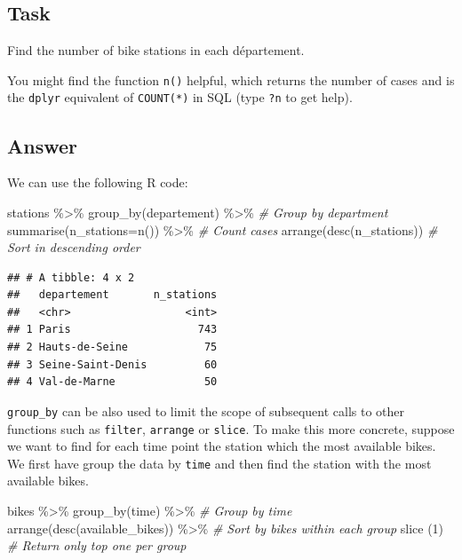 \documentclass[
]{book}
\newenvironment{Shaded}{\begin{snugshade}}{\end{snugshade}}
\newcommand{\AttributeTok}[1]{\textcolor[rgb]{0.77,0.63,0.00}{#1}}
\newcommand{\CommentTok}[1]{\textcolor[rgb]{0.56,0.35,0.01}{\textit{#1}}}
\newcommand{\DecValTok}[1]{\textcolor[rgb]{0.00,0.00,0.81}{#1}}
\newcommand{\FunctionTok}[1]{\textcolor[rgb]{0.00,0.00,0.00}{#1}}
\newcommand{\NormalTok}[1]{#1}
\newcommand{\SpecialCharTok}[1]{\textcolor[rgb]{0.00,0.00,0.00}{#1}}
\begin{document}
\hypertarget{task-6}{%
\subsection{Task}\label{task-6}}

Find the number of bike stations in each département.

You might find the function \texttt{n()} helpful, which returns the number of cases and is the \texttt{dplyr} equivalent of \texttt{COUNT(*)} in SQL (type \texttt{?n} to get help).

\hypertarget{answer-5}{%
\subsection{Answer}\label{answer-5}}

We can use the following R code:

\begin{Shaded}
\begin{Highlighting}[]
\NormalTok{stations }\SpecialCharTok{\%\textgreater{}\%} \FunctionTok{group\_by}\NormalTok{(departement) }\SpecialCharTok{\%\textgreater{}\%}         \CommentTok{\# Group by department}
  \FunctionTok{summarise}\NormalTok{(}\AttributeTok{n\_stations=}\FunctionTok{n}\NormalTok{()) }\SpecialCharTok{\%\textgreater{}\%}                \CommentTok{\# Count cases}
  \FunctionTok{arrange}\NormalTok{(}\FunctionTok{desc}\NormalTok{(n\_stations))                    }\CommentTok{\# Sort in descending order}
\end{Highlighting}
\end{Shaded}

\begin{verbatim}
## # A tibble: 4 x 2
##   departement       n_stations
##   <chr>                  <int>
## 1 Paris                    743
## 2 Hauts-de-Seine            75
## 3 Seine-Saint-Denis         60
## 4 Val-de-Marne              50
\end{verbatim}

\texttt{group\_by} can be also used to limit the scope of subsequent calls to other functions such as \texttt{filter}, \texttt{arrange} or \texttt{slice}. To make this more concrete, suppose we want to find for each time point the station which the most available bikes. We first have group the data by \texttt{time} and then find the station with the most available bikes.

\begin{Shaded}
\begin{Highlighting}[]
\NormalTok{bikes }\SpecialCharTok{\%\textgreater{}\%}                                     
  \FunctionTok{group\_by}\NormalTok{(time) }\SpecialCharTok{\%\textgreater{}\%}                           \CommentTok{\# Group by time}
  \FunctionTok{arrange}\NormalTok{(}\FunctionTok{desc}\NormalTok{(available\_bikes)) }\SpecialCharTok{\%\textgreater{}\%}           \CommentTok{\# Sort by bikes within each group}
  \FunctionTok{slice}\NormalTok{ (}\DecValTok{1}\NormalTok{)                                    }\CommentTok{\# Return only top one per group}
\end{Highlighting}
\end{Shaded}
\end{document}
